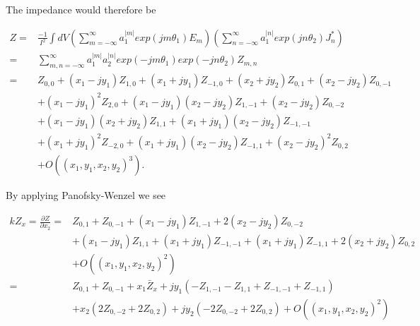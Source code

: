 \documentclass[review, number, sort&compress]{elsarticle}
\begin{document}
The impedance would therefore be

\begin{align}
Z = &\frac{-1}{I^{2}} \int dV \left( \displaystyle\sum\limits^{\infty}_{m=-\infty} a_{1}^{|m|} exp \left( jm\theta_{1} \right) E_{m}\right) \left( \displaystyle\sum\limits^{\infty}_{n=-\infty} a_{1}^{|n|} exp \left( jn\theta_{2} \right) J^{*}_{n}\right) \nonumber \\
   = &\displaystyle\sum\limits^{\infty}_{m,n=-\infty} a_{1}^{|m|} a_{2}^{|n|} exp\left( -jm\theta_{1} \right) exp\left( -jn\theta_{2} \right) Z_{m,n} \nonumber \\
   = &Z_{0,0} + \left( x_{1}- jy_{1} \right)Z_{1,0} + \left( x_{1} + jy_{1} \right)Z_{-1,0} + \left( x_{2} + jy_{2} \right)Z_{0,1} +  \left( x_{2} - jy_{2} \right)Z_{0,-1} \nonumber \\
      & +\left( x_{1} - jy_{1} \right)^{2}Z_{2,0} +  \left( x_{1} - jy_{1} \right)\left( x_{2} - jy_{2} \right)Z_{1,-1} + \left( x_{2} - jy_{2} \right) Z_{0,-2} \nonumber \\
      & +\left( x_{1} - jy_{1} \right)\left( x_{2} + jy_{2} \right)Z_{1,1} + \left( x_{1} + jy_{1} \right) \left( x_{2} - jy_{2} \right) Z_{-1,-1} \nonumber \\
      & +\left( x_{1} + jy_{1} \right)^{2}Z_{-2,0} + \left( x_{1} + jy_{1} \right)\left( x_{2} - jy_{2} \right) Z_{-1,1} + \left( x_{2} - jy_{2} \right)^{2}Z_{0,2} \nonumber \\
      & +O\left( \left(  x_{1},y_{1},x_{2},y_{2} \right)^{3} \right).
\label{eqn:gen_imp}
\end{align}

By applying Panofsky-Wenzel we see

\begin{align}
kZ_{x} =\frac{\partial Z}{\partial x_{2}} = & Z_{0,1} + Z_{0,-1} + \left( x_{1} - jy_{1} \right) Z_{1,-1} + 2\left( x_{2} - jy_{2} \right) Z_{0,-2} \nonumber \\
						&+ \left( x_{1} - jy_{1} \right) Z_{1,1} + \left( x_{1} + jy_{1} \right) Z_{-1,-1} + \left( x_{1} + jy_{1} \right) Z_{-1,1} + 2\left( x_{2} + jy_{2} \right) Z_{0,2} \nonumber \\
						& + O\left( \left( x_{1},y_{1},x_{2},y_{2} \right)^{2} \right) \nonumber \\
						= & Z_{0,1} + Z_{0,-1} + x_{1}\bar{Z}_{x} + jy_{1} \left( -Z_{1,-1} - Z_{1,1} + Z_{-1,-1} + Z_{-1,1} \right) \nonumber \\
						& + x_{2}\left( 2Z_{0,-2} + 2Z_{0,2}  \right) + jy_{2}\left( -2Z_{0,-2} + 2Z_{0,2}  \right) +  O\left( \left( x_{1},y_{1},x_{2},y_{2} \right)^{2} \right)
\end{align}
\end{document}
